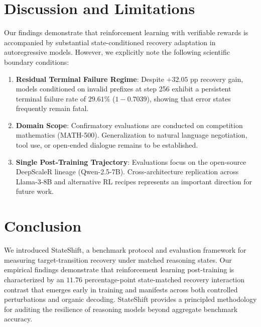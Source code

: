 \documentclass{article}
\begin{document}
\section{Discussion and Limitations}
Our findings demonstrate that reinforcement learning with verifiable rewards is accompanied by substantial state-conditioned recovery adaptation in autoregressive models. However, we explicitly note the following scientific boundary conditions:
\begin{enumerate}
    \item \textbf{Residual Terminal Failure Regime}: Despite $+32.05$ pp recovery gain, models conditioned on invalid prefixes at step 256 exhibit a persistent terminal failure rate of $29.61\%$ ($1 - 0.7039$), showing that error states frequently remain fatal.
    \item \textbf{Domain Scope}: Confirmatory evaluations are conducted on competition mathematics (MATH-500). Generalization to natural language negotiation, tool use, or open-ended dialogue remains to be established.
    \item \textbf{Single Post-Training Trajectory}: Evaluations focus on the open-source DeepScaleR lineage (Qwen-2.5-7B). Cross-architecture replication across Llama-3-8B and alternative RL recipes represents an important direction for future work.
\end{enumerate}

\section{Conclusion}
We introduced StateShift, a benchmark protocol and evaluation framework for measuring target-transition recovery under matched reasoning states. Our empirical findings demonstrate that reinforcement learning post-training is characterized by an $11.76$ percentage-point state-matched recovery interaction contrast that emerges early in training and manifests across both controlled perturbations and organic decoding. StateShift provides a principled methodology for auditing the resilience of reasoning models beyond aggregate benchmark accuracy.



\end{document}
